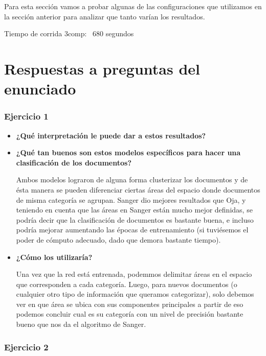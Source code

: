 Para esta sección vamos a probar algunas de las configuraciones que utilizamos en la sección anterior para analizar que tanto varían los resultados.

Tiempo de corrida 3comp: ~680 segundos

\newpage
\section{Respuestas a preguntas del enunciado}

\subsubsection{Ejercicio 1}

\begin{itemize}

\item \textbf{¿Qué interpretación le puede dar a estos resultados?} 

\item \textbf{¿Qué tan buenos son estos modelos específicos para hacer una clasificación de los documentos?}

Ambos modelos lograron de alguna forma clusterizar los documentos y de ésta manera se pueden diferenciar ciertas áreas del espacio
donde documentos de misma categoría se agrupan. Sanger dio mejores resultados que Oja, y teniendo en cuenta que las áreas en Sanger
están mucho mejor definidas, se podría decir que la clasificación de documentos es bastante buena, e incluso podría mejorar aumentando
las épocas de entrenamiento (si tuviésemos el poder de cómputo adecuado, dado que demora bastante tiempo).

\item \textbf{¿Cómo los utilizaría?}

Una vez que la red está entrenada, podemmos delimitar áreas en el espacio que corresponden a cada categoría. Luego, para nuevos documentos
(o cualquier otro tipo de información que queramos categorizar), solo debemos ver en que área se ubica con sus componentes principales a partir de
eso podemos concluir cual es su categoría con un nivel de precisión bastante bueno que nos da el algoritmo de Sanger.

\end{itemize}

\subsubsection{Ejercicio 2}

